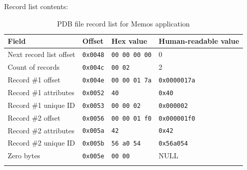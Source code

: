\documentclass[a4paper,12pt,oneside]{scrartcl}
\begin{document}
Record list contents:
\begin{longtable}{|p{4cm}|l|l|p{4cm}|}
  \hline
  \textbf{Field} & \textbf{Offset} & \textbf{Hex value} & \textbf{Human-readable value} \\
  \hline
  Next record list offset & \texttt{0x0048} & \texttt{00 00 00 00} & 0 \\
  \hline
  Count of records & \texttt{0x004c} & \texttt{00 02} & 2 \\
  \hline
  Record \#1 offset & \texttt{0x004e} & \texttt{00 00 01 7a} & \texttt{0x0000017a} \\
  \hline
  Record \#1 attributes & \texttt{0x0052} & \texttt{40} & \texttt{0x40} \\
  \hline
  Record \#1 unique ID & \texttt{0x0053} & \texttt{00 00 02} & \texttt{0x000002} \\
  \hline
  Record \#2 offset & \texttt{0x0056} & \texttt{00 00 01 f0} & \texttt{0x000001f0} \\
  \hline
  Record \#2 attributes & \texttt{0x005a} & \texttt{42} & \texttt{0x42} \\
  \hline
  Record \#2 unique ID & \texttt{0x005b} & \texttt{56 a0 54} & \texttt{0x56a054} \\
  \hline
  Zero bytes & \texttt{0x005e} & \texttt{00 00} & NULL \\
  \hline
  \caption{PDB file record list for Memos application}
  \label{tab:memo-record-list}
\end{longtable}
\end{document}
